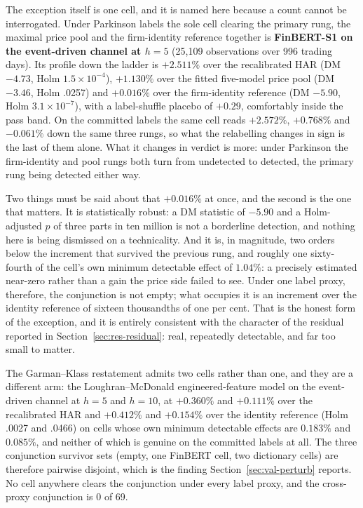 The exception itself is one cell, and it is named here because a count
cannot be interrogated. Under Parkinson labels the sole cell clearing the
primary rung, the maximal price pool and the firm-identity reference
together is \textbf{FinBERT-S1 on the event-driven channel at $h{=}5$}
(25{,}109 observations over 996 trading days). Its profile down the ladder
is $+2.511\%$ over the recalibrated HAR (DM $-4.73$, Holm
$1.5\times10^{-4}$), $+1.130\%$ over the fitted five-model price pool (DM
$-3.46$, Holm .0257) and $+0.016\%$ over the firm-identity reference (DM
$-5.90$, Holm $3.1\times10^{-7}$), with a label-shuffle placebo of $+0.29$,
comfortably inside the pass band. %
On the committed labels the same cell reads $+2.572\%$, $+0.768\%$ and
$-0.061\%$ down the same three rungs, so what the relabelling changes in
sign is the last of them alone. What it changes in verdict is more: under
Parkinson the firm-identity and pool rungs both turn from undetected to
detected, the primary rung being detected either way. %

Two things must be said about that $+0.016\%$ at once, and the second is
the one that matters. It is statistically robust: a DM statistic of
$-5.90$ and a Holm-adjusted $p$ of three parts in ten million is not a
borderline detection, and nothing here is being dismissed on a
technicality. And it is, in magnitude, two orders below the increment that
survived the previous rung, and roughly one sixty-fourth of the cell's own
minimum detectable effect of $1.04\%$: a precisely estimated near-zero
rather than a gain the price side failed to see. Under one label proxy,
therefore, the conjunction is not empty; what occupies it is an increment
over the identity reference of sixteen thousandths of one per cent. That
is the honest form of the exception, and it is entirely consistent with the
character of the residual reported in
Section~\ref{sec:res-residual}: real, repeatedly detectable, and far too
small to matter.

The Garman--Klass restatement admits two cells rather than one, and they
are a different arm: the Loughran--McDonald engineered-feature model on the
event-driven channel at $h{=}5$ and $h{=}10$, at $+0.360\%$ and $+0.111\%$
over the recalibrated HAR and $+0.412\%$ and $+0.154\%$ over the identity
reference (Holm .0027 and .0466) on cells whose own
minimum detectable effects are $0.183\%$ and $0.085\%$, and neither of
which is genuine on the committed labels at all. %
The three conjunction survivor sets (empty, one FinBERT cell, two
dictionary cells) are therefore pairwise disjoint, which is the finding
Section~\ref{sec:val-perturb} reports. No cell anywhere clears the
conjunction under every label proxy, and the cross-proxy conjunction is 0
of 69.

